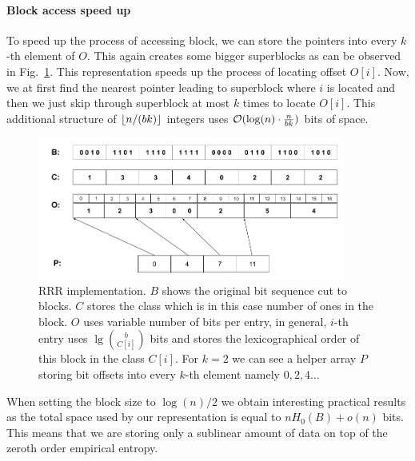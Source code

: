 \paragraph{Block access speed up}

To speed up the process of accessing block, we can store the pointers into every $k$-th element
of $O$. This again creates some bigger superblocks as can be observed in Fig.~\ref{obr:RRRFinal}.
This representation speeds up the process of locating offset $O[i]$. Now, we at first find the
nearest pointer leading to superblock where $i$ is located and then we just skip through superblock
at most $k$ times to locate $O[i]$. This additional structure of $\left\lfloor n/(bk) \right\rfloor$ integers uses
$\mathcal{O}(\log(n)\cdot \frac{n}{bk})$ bits of space.

\begin{figure}
	\centerline{
		\includegraphics[width=0.9\textwidth, height=0.3\textheight]{images/rrr}
	}
	\caption[TODO]{RRR implementation. $B$ shows the original bit sequence cut to
    blocks. $C$ stores the class which is in this case number of ones in the block.
    $O$ uses variable number of bits per entry, in general, $i$-th entry uses
    $\lg {b\choose C[i]}$ bits and stores the lexicographical order
    of this block in the class $C[i]$. For $k=2$ we can see a helper array $P$
    storing bit offsets into every $k$-th element namely $0, 2, 4\ldots$
	}
	\label{obr:RRRFinal}
\end{figure}

When setting the block size to $\log(n)/2$ we obtain interesting practical results as
the total space used by our representation is equal to $nH_0(B) + o(n)$ bits. This means
that we are storing only a sublinear amount of data on top of the zeroth order empirical entropy.

